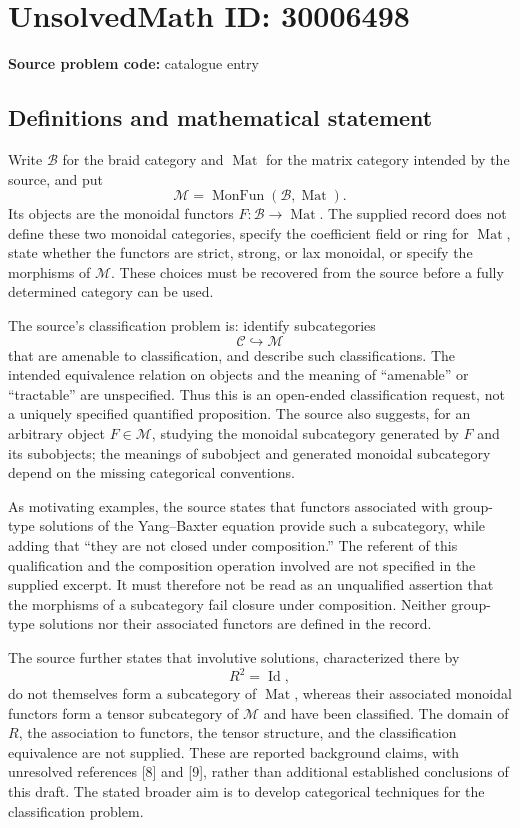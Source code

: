 \documentclass[11pt]{article}
\begin{document}
\section*{UnsolvedMath ID: 30006498}
\textbf{Source problem code:} catalogue entry
\subsection{Definitions and mathematical statement}
Write \(\mathcal B\) for the braid category and \(\operatorname{Mat}\) for the matrix category intended by the source, and put
\[
\mathscr M=\operatorname{MonFun}(\mathcal B,\operatorname{Mat}).
\]
Its objects are the monoidal functors \(F:\mathcal B\to\operatorname{Mat}\). The supplied record does not define these two monoidal categories, specify the coefficient field or ring for \(\operatorname{Mat}\), state whether the functors are strict, strong, or lax monoidal, or specify the morphisms of \(\mathscr M\). These choices must be recovered from the source before a fully determined category can be used.

The source's classification problem is: identify subcategories
\[
\mathcal C\hookrightarrow\mathscr M
\]
that are amenable to classification, and describe such classifications. The intended equivalence relation on objects and the meaning of ``amenable'' or ``tractable'' are unspecified. Thus this is an open-ended classification request, not a uniquely specified quantified proposition. The source also suggests, for an arbitrary object \(F\in\mathscr M\), studying the monoidal subcategory generated by \(F\) and its subobjects; the meanings of subobject and generated monoidal subcategory depend on the missing categorical conventions.

As motivating examples, the source states that functors associated with group-type solutions of the Yang--Baxter equation provide such a subcategory, while adding that ``they are not closed under composition.'' The referent of this qualification and the composition operation involved are not specified in the supplied excerpt. It must therefore not be read as an unqualified assertion that the morphisms of a subcategory fail closure under composition. Neither group-type solutions nor their associated functors are defined in the record.

The source further states that involutive solutions, characterized there by
\[
R^2=\operatorname{Id},
\]
do not themselves form a subcategory of \(\operatorname{Mat}\), whereas their associated monoidal functors form a tensor subcategory of \(\mathscr M\) and have been classified. The domain of \(R\), the association to functors, the tensor structure, and the classification equivalence are not supplied. These are reported background claims, with unresolved references [8] and [9], rather than additional established conclusions of this draft. The stated broader aim is to develop categorical techniques for the classification problem.
\end{document}
